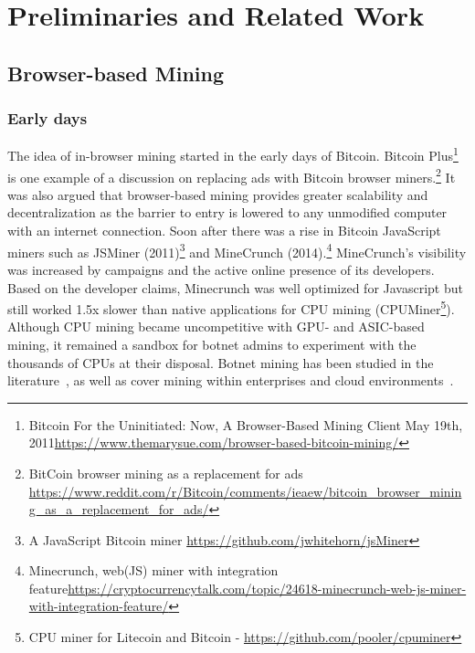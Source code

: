 %
%
%
%
%
%

\section{Preliminaries and Related Work}

\subsection{Browser-based Mining}

\subsubsection{Early days}
The idea of in-browser mining started in the early days of Bitcoin. Bitcoin Plus\footnote{Bitcoin For the Uninitiated: Now, A Browser-Based Mining Client  May 19th, 2011\url{https://www.themarysue.com/browser-based-bitcoin-mining/}} is one example of a discussion on replacing ads with Bitcoin browser miners.\footnote{BitCoin browser mining as a replacement for ads \url{https://www.reddit.com/r/Bitcoin/comments/ieaew/bitcoin_browser_mining_as_a_replacement_for_ads/}} It was also argued that browser-based mining provides greater scalability and decentralization as the barrier to entry is lowered to any unmodified computer with an internet connection. Soon after there was a rise in Bitcoin JavaScript miners such as JSMiner (2011)\footnote{A JavaScript Bitcoin miner \url{https://github.com/jwhitehorn/jsMiner}} and MineCrunch (2014).\footnote{Minecrunch, web(JS) miner with integration feature\url{https://cryptocurrencytalk.com/topic/24618-minecrunch-web-js-miner-with-integration-feature/}} MineCrunch's visibility was increased by campaigns and the active online presence of its developers. Based on the developer claims, Minecrunch was well optimized for Javascript but still worked 1.5x slower than native applications for CPU mining (\eg CPUMiner\footnote{CPU miner for Litecoin and Bitcoin - \url{https://github.com/pooler/cpuminer}}). Although CPU mining  became uncompetitive with GPU- and ASIC-based mining, it remained a sandbox for botnet admins to experiment with the thousands of CPUs at their disposal. Botnet mining has been studied in the literature~\cite{huang2014botcoin,wyke2012zeroaccess}, as well as cover mining within enterprises and cloud environments~\cite{MiningonSOeDime2017}.

